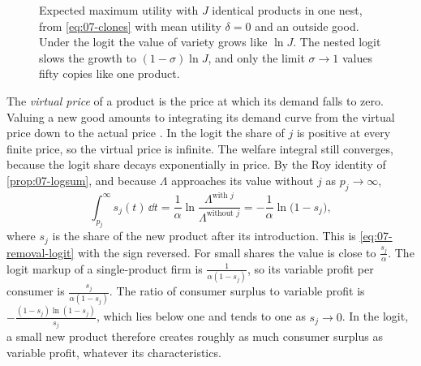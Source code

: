 \begin{figure}[htbp]
\centering
{}
\caption{Expected maximum utility with $J$ identical products in one nest, from \eqref{eq:07-clones} with mean
utility $\delta = 0$ and an outside good. Under the logit the value of variety grows like $\ln J$. The nested logit
slows the growth to $(1-\sigma)\ln J$, and only the limit $\sigma \to 1$ values fifty copies like one product.}
\label{fig:07-clones}
\end{figure}

The \emph{virtual price} of a product is the price at which its demand falls to zero. Valuing a new good amounts to
integrating its demand curve from the virtual price down to the actual price \citep{Hausman1997}. In the logit the
share of $j$ is positive at every finite price, so the virtual price is infinite. The welfare integral still converges,
because the logit share decays exponentially in price. By the Roy identity of \cref{prop:07-logsum}, and because
$\Lambda$ approaches its value without $j$ as $p_j \to \infty$,
\begin{equation}\label{eq:07-newgood}
\int_{p_j}^{\infty}s_j(t)\,\dd t = \frac{1}{\alpha}\ln\frac{\Lambda^{\text{with } j}}{\Lambda^{\text{without } j}}
= -\frac{1}{\alpha}\ln\big(1 - s_j\big) ,
\end{equation}
where $s_j$ is the share of the new product after its introduction. This is \eqref{eq:07-removal-logit} with the sign
reversed. For small shares the value is close to $\frac{s_j}{\alpha}$. The logit markup of a single-product firm is
$\frac{1}{\alpha(1-s_j)}$, so its variable profit per consumer is $\frac{s_j}{\alpha(1-s_j)}$. The ratio of consumer
surplus to variable profit is $-\frac{(1-s_j)\ln(1-s_j)}{s_j}$, which lies below one and tends to one as $s_j \to 0$. In
the logit, a small new product therefore creates roughly as much consumer surplus as variable profit, whatever its
characteristics.

